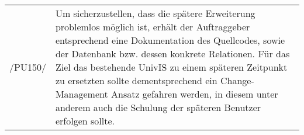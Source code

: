 \begin{tabular}{p{1.5cm}p{14.5cm}}

	 /PU150/	&  Um sicherzustellen, dass die spätere Erweiterung problemlos möglich ist, erhält der Auftraggeber entsprechend eine Dokumentation des Quellcodes, sowie der Datenbank bzw. dessen konkrete Relationen.
Für das Ziel das bestehende UnivIS zu einem späteren Zeitpunkt zu ersetzten sollte dementsprechend ein Change-Management Ansatz gefahren werden, in diesem unter anderem auch die Schulung der späteren Benutzer erfolgen sollte. \\[0.25cm]


\end{tabular}


